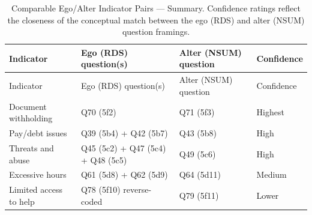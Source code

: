 \documentclass[
  12pt,
  letterpaper,
  DIV=11,
  numbers=noendperiod]{scrreprt}
\begin{document}
\begin{longtable}[]{@{}
  >{\raggedright\arraybackslash}p{}
  >{\raggedright\arraybackslash}p{}
  >{\raggedright\arraybackslash}p{}
  >{\raggedright\arraybackslash}p{}@{}}
\caption{Comparable Ego/Alter Indicator Pairs --- Summary. Confidence
ratings reflect the closeness of the conceptual match between the ego
(RDS) and alter (NSUM) question
framings.}\label{tbl-ego-alter-summary}\tabularnewline
\toprule\noalign{}
\begin{minipage}[b]{\linewidth}\raggedright
Indicator
\end{minipage} & \begin{minipage}[b]{\linewidth}\raggedright
Ego (RDS) question(s)
\end{minipage} & \begin{minipage}[b]{\linewidth}\raggedright
Alter (NSUM) question
\end{minipage} & \begin{minipage}[b]{\linewidth}\raggedright
Confidence
\end{minipage} \\
\midrule\noalign{}
\endfirsthead
\toprule\noalign{}
\begin{minipage}[b]{\linewidth}\raggedright
Indicator
\end{minipage} & \begin{minipage}[b]{\linewidth}\raggedright
Ego (RDS) question(s)
\end{minipage} & \begin{minipage}[b]{\linewidth}\raggedright
Alter (NSUM) question
\end{minipage} & \begin{minipage}[b]{\linewidth}\raggedright
Confidence
\end{minipage} \\
\midrule\noalign{}
\endhead
\bottomrule\noalign{}
\endlastfoot
Document withholding & Q70 (5f2) & Q71 (5f3) & Highest \\
Pay/debt issues & Q39 (5b4) + Q42 (5b7) & Q43 (5b8) & High \\
Threats and abuse & Q45 (5c2) + Q47 (5c4) + Q48 (5c5) & Q49 (5c6) &
High \\
Excessive hours & Q61 (5d8) + Q62 (5d9) & Q64 (5d11) & Medium \\
Limited access to help & Q78 (5f10) reverse-coded & Q79 (5f11) &
Lower \\
\end{longtable}
\end{document}
